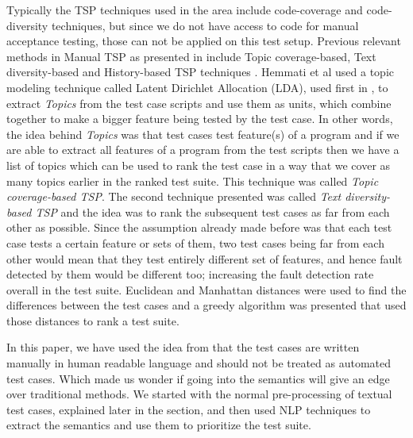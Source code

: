 \documentclass[conference]{IEEEtran}
\begin{document}
Typically the TSP techniques used in the area include code-coverage and code-diversity techniques, but since we do not have access to code for manual acceptance testing, those can not be applied on this test setup. Previous relevant methods in Manual TSP as presented in \cite{hemmati2015prioritization} include Topic coverage-based, Text diversity-based and History-based TSP techniques . Hemmati et al \cite{hemmati2015prioritization} used a topic modeling technique called Latent Dirichlet Allocation (LDA), used first in \cite{thomas2014prioritization}, to extract \textit{Topics} from the test case scripts and use them as units, which combine together to make a bigger feature being tested by the test case. In other words, the idea behind \textit{Topics} was that test cases test feature(s) of a program and if we are able to extract all features of a program from the test scripts then we have a list of topics which can be used to rank the test case in a way that we cover as many topics earlier in the ranked test suite. This technique was called \textit{Topic coverage-based TSP}. The second technique presented was called \textit{Text diversity-based TSP} and the idea was to rank the subsequent test cases as far from each other as possible. Since the assumption already made before was that each test case tests a certain feature or sets of them, two test cases being far from each other would mean that they test entirely different set of features, and hence fault detected by them would be different too; increasing the fault detection rate overall in the test suite. Euclidean and Manhattan distances were used to find the differences between the test cases and a greedy algorithm was presented that used those distances to rank a test suite. 
\par
In this paper, we have used the idea from \cite{hemmati2015prioritization} that the test cases are written manually in human readable language and should not be treated as automated test cases. Which made us wonder if going into the semantics will give an edge over traditional methods. We started with the normal pre-processing of textual test cases, explained later in the section, and then used NLP techniques to extract the semantics and use them to prioritize the test suite.
\par
\end{document}
